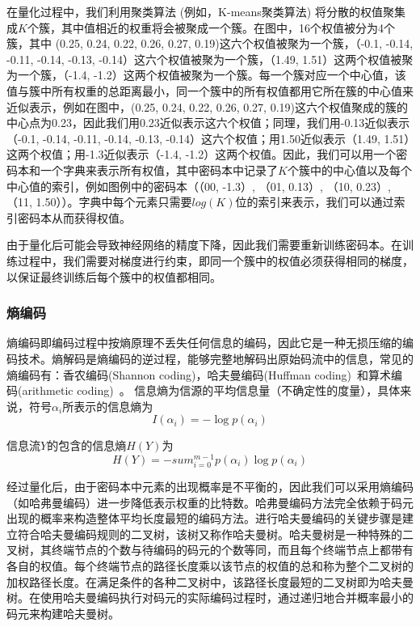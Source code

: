 在量化过程中，我们利用聚类算法 (例如，K-means聚类算法) 将分散的权值聚集成$K$个簇，其中值相近的权重将会被聚成一个簇。在图中，16个权值被分为4个簇，其中 (0.25, 0.24, 0.22, 0.26, 0.27, 0.19)这六个权值被聚为一个簇，（-0.1, -0.14, -0.11, -0.14, -0.13, -0.14）这六个权值被聚为一个簇，（1.49, 1.51）这两个权值被聚为一个簇，（-1.4, -1.2）这两个权值被聚为一个簇。每一个簇对应一个中心值，该值与簇中所有权重的总距离最小，同一个簇中的所有权值都用它所在簇的中心值来近似表示，例如在图中，(0.25, 0.24, 0.22, 0.26, 0.27, 0.19)这六个权值聚成的簇的中心点为0.23，因此我们用0.23近似表示这六个权值；同理，我们用-0.13近似表示（-0.1, -0.14, -0.11, -0.14, -0.13, -0.14）这六个权值；用1.50近似表示（1.49, 1.51）这两个权值；用-1.3近似表示（-1.4, -1.2）这两个权值。因此，我们可以用一个密码本和一个字典来表示所有权值，其中密码本中记录了$K$个簇中的中心值以及每个中心值的索引，例如图例中的密码本（（00, -1.3）, （01, 0.13）, （10, 0.23）, （11, 1.50））。字典中每个元素只需要$log(K)$位的索引来表示，我们可以通过索引密码本从而获得权值。

由于量化后可能会导致神经网络的精度下降，因此我们需要重新训练密码本。在训练过程中，我们需要对梯度进行约束，即同一个簇中的权值必须获得相同的梯度，以保证最终训练后每个簇中的权值都相同。

\subsubsection{熵编码}


熵编码即编码过程中按熵原理不丢失任何信息的编码，因此它是一种无损压缩的编码技术。熵解码是熵编码的逆过程，能够完整地解码出原始码流中的信息，常见的熵编码有：香农编码(Shannon coding)，哈夫曼编码(Huffman coding)~\cite{huffman1952method}和算术编码(arithmetic coding)~\cite{witten1987arithmetic}。
信息熵为信源的平均信息量（不确定性的度量），具体来说，符号$\alpha_i$所表示的信息熵为
\begin{equation}
I(\alpha _i) = -\log p(\alpha _i)
\end{equation}

信息流$Y$的包含的信息熵$H(Y)$为
\begin{equation}
H(Y) = -sum_{i=0}^{m-1} p(\alpha _i) \log p(\alpha _i)
\end{equation}

经过量化后，由于密码本中元素的出现概率是不平衡的，因此我们可以采用熵编码（如哈弗曼编码）进一步降低表示权重的比特数。哈弗曼编码方法完全依赖于码元出现的概率来构造整体平均长度最短的编码方法。进行哈夫曼编码的关键步骤是建立符合哈夫曼编码规则的二叉树，该树又称作哈夫曼树。哈夫曼树是一种特殊的二叉树，其终端节点的个数与待编码的码元的个数等同，而且每个终端节点上都带有各自的权值。每个终端节点的路径长度乘以该节点的权值的总和称为整个二叉树的加权路径长度。在满足条件的各种二叉树中，该路径长度最短的二叉树即为哈夫曼树。在使用哈夫曼编码执行对码元的实际编码过程时，通过递归地合并概率最小的码元来构建哈夫曼树。

